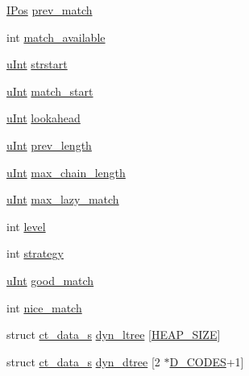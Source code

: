 \begin{DoxyCompactItemize}
\item 
\hyperlink{deflate_8h_ada696b787a46d01634b6365afcec1a9e}{I\+Pos} \hyperlink{structinternal__state_a0f5871de1be252ed0496a8b7a30464ef}{prev\+\_\+match}
\item 
int \hyperlink{structinternal__state_accddba15d8b54ca3f10163fa920599f4}{match\+\_\+available}
\item 
\hyperlink{zconf_8h_a87d141052bcd5ec8a80812a565c70369}{u\+Int} \hyperlink{structinternal__state_a946579b9b86ee466424ffb0a67eb7060}{strstart}
\item 
\hyperlink{zconf_8h_a87d141052bcd5ec8a80812a565c70369}{u\+Int} \hyperlink{structinternal__state_aced58a85c56daa1c5de41fa5ce75d2e8}{match\+\_\+start}
\item 
\hyperlink{zconf_8h_a87d141052bcd5ec8a80812a565c70369}{u\+Int} \hyperlink{structinternal__state_a3a826064126ee19a77f78919e2f9bb1e}{lookahead}
\item 
\hyperlink{zconf_8h_a87d141052bcd5ec8a80812a565c70369}{u\+Int} \hyperlink{structinternal__state_a7619fb70f9f66ff21b419b8ceac4904c}{prev\+\_\+length}
\item 
\hyperlink{zconf_8h_a87d141052bcd5ec8a80812a565c70369}{u\+Int} \hyperlink{structinternal__state_ab1ffa7feb159edec170574813fae3279}{max\+\_\+chain\+\_\+length}
\item 
\hyperlink{zconf_8h_a87d141052bcd5ec8a80812a565c70369}{u\+Int} \hyperlink{structinternal__state_ab74215ec1c106bf588a7642927d47b84}{max\+\_\+lazy\+\_\+match}
\item 
int \hyperlink{structinternal__state_a7ad2ab1df80c8cab4ffb97ff84e88c62}{level}
\item 
int \hyperlink{structinternal__state_a67219312df7fd2f86e06e6f14700eb28}{strategy}
\item 
\hyperlink{zconf_8h_a87d141052bcd5ec8a80812a565c70369}{u\+Int} \hyperlink{structinternal__state_a68ba00254242017f330dca5e0191bca4}{good\+\_\+match}
\item 
int \hyperlink{structinternal__state_a39ab99e52138c0628f645bc1e0c69a04}{nice\+\_\+match}
\item 
struct \hyperlink{structct__data__s}{ct\+\_\+data\+\_\+s} \hyperlink{structinternal__state_ae11867c05d54c575dbc713bbea71266c}{dyn\+\_\+ltree} \mbox{[}\hyperlink{deflate_8h_a1b45302695680930829cac31d65e41e1}{H\+E\+A\+P\+\_\+\+S\+I\+ZE}\mbox{]}
\item 
struct \hyperlink{structct__data__s}{ct\+\_\+data\+\_\+s} \hyperlink{structinternal__state_a42a52476d3cde41e57a6ef2a6a78008f}{dyn\+\_\+dtree} \mbox{[}2 $\ast$\hyperlink{deflate_8h_a8798a9a526623abbd88fedb0727e21aa}{D\+\_\+\+C\+O\+D\+ES}+1\mbox{]}

\end{DoxyCompactItemize}
